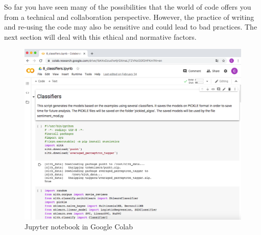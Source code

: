 So far you have seen many of the possibilities that the world of code offers you from a technical and collaboration perspective. However, the practice of writing and re-using the code may also be sensitive and could lead to bad practices. The next section will deal with this ethical and normative factors.

\begin{figure}
\centering
\includegraphics[width=0.9\linewidth]{figures/ch04_colab}
\caption{Jupyter notebook in Google Colab}
\label{fig:colab}
\end{figure}